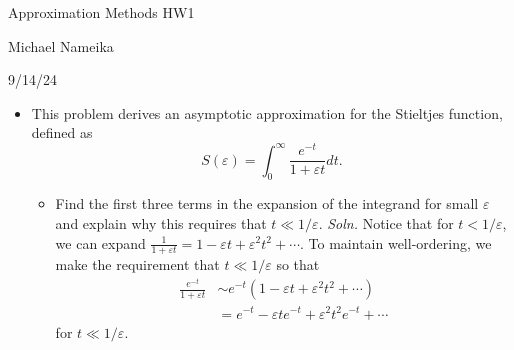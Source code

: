 \documentclass{article}
\begin{document}
\begin{center}
    {\Huge Approximation Methods HW1}
    \vspace{0.5cm}

    {\Large Michael Nameika}
    \vspace{0.5cm}

    {\large 9/14/24}
    \vspace{0.5cm}

    
\end{center}

\begin{itemize}
    \item[\textbf{1.9}] This problem derives an asymptotic approximation for the Stieltjes function, defined as
    \[S(\varepsilon) = \int_0^{\infty} \frac{e^{-t}}{1 + \varepsilon t}dt.\]
    \begin{itemize}
        \item[(a)] Find the first three terms  in the expansion of the integrand for small $\varepsilon$ and explain why this requires that $t \ll 1/\varepsilon$.
        \newline\newline
        \textit{Soln.} Notice that for $t < 1/\varepsilon$, we can expand $\frac{1}{1 + \varepsilon t} = 1 - \varepsilon t + \varepsilon^2t^2 + \cdots$. To maintain well-ordering, we make the requirement that $t \ll 1/\varepsilon$ so that 
        \begin{align*}
            \frac{e^{-t}}{1 + \varepsilon t} &\sim e^{-t}\left(1 - \varepsilon t + \varepsilon^2t^2 + \cdots\right)\\
            &= e^{-t} - \varepsilon te^{-t} + \varepsilon^2 t^2 e^{-t} + \cdots
        \end{align*}
        for $t \ll 1/\varepsilon$.
        \newline\newline
        

\end{itemize}
\end{itemize}
\end{document}
